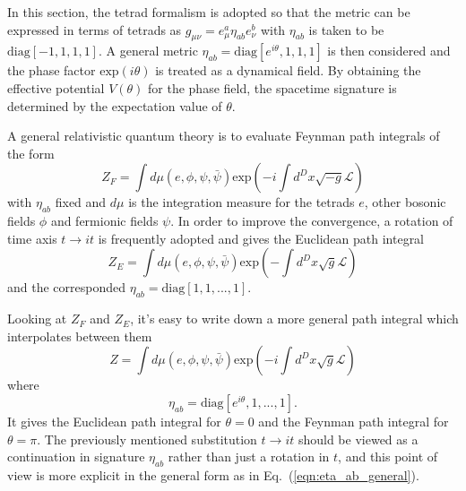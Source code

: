 \documentclass[%
 reprint,
groupedaddress,
showpacs,
 amsmath,amssymb,
 aps,
prb,
]{revtex4-1}
\begin{document}
In this section, the tetrad formalism is adopted so that the metric can be expressed in terms of tetrads as $ g_{\mu\nu} = e^{a}_{\mu} \eta_{ab} e^{b}_{\nu} $ with $ \eta_{ab} $ is taken to be $ \mathrm{diag}[-1,1,1,1] $. A general metric $ \eta_{ab} = \mathrm{diag}[e^{i \theta},1,1,1] $ is then considered and the phase factor $ \mathrm{exp}(i \theta) $ is treated as a dynamical field. By obtaining the effective potential $ V(\theta) $ for the phase field, the spacetime signature is determined by the expectation value of $\theta $.

A general relativistic quantum theory is to evaluate Feynman path integrals of the form
\begin{equation}
Z_F = \int d \mu (e,\phi,\psi,\bar \psi) \mathrm{exp} \left (-i\int d^D x \sqrt{-g} \mathcal L \right )
\end{equation}
with $ \eta_{ab} $ fixed and $ d \mu $ is the integration measure for the tetrads $ e$, other bosonic fields $ \phi $ and fermionic fields $ \psi $. In order to improve the convergence, a rotation of time axis $ t \rightarrow it $ is frequently adopted and gives the Euclidean path integral
\begin{equation}
Z_E = \int d \mu (e,\phi,\psi,\bar \psi) \mathrm{exp} \left (-\int d^D x \sqrt{g} \mathcal L \right )
\end{equation}
and the corresponded $ \eta_{ab} = \mathrm{diag}[1,1,...,1] $.

Looking at $Z_F$ and $Z_E$, it's easy to write down a more general path integral which interpolates between them
\begin{equation}
\label{eqn:general_path_int}
Z = \int d \mu (e,\phi,\psi,\bar \psi) \mathrm{exp} \left (-i\int d^D x \sqrt{g} \mathcal L \right )
\end{equation}
where
\begin{equation}
\label{eqn:eta_ab_general}
\eta_{ab} = \mathrm{diag}[e^{i \theta},1,...,1].
\end{equation}
It gives the Euclidean path integral for $ \theta=0 $ and the Feynman path integral for $\theta = \pi $. The previously mentioned substitution $ t \rightarrow it $ should be viewed as a continuation in signature $ \eta_{ab} $ rather than just a rotation in $t$, and this point of view is more explicit in the general form as in Eq.~(\ref{eqn:eta_ab_general}).
\end{document}
